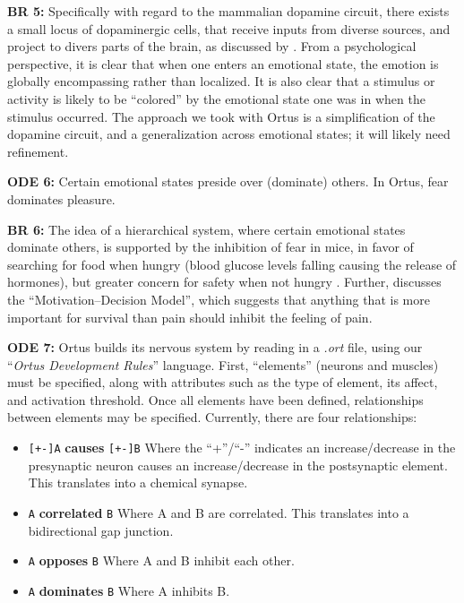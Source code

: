 \documentclass[letterpaper]{article}
\begin{document}
\textbf{BR 5:} Specifically with regard to the mammalian dopamine circuit, there exists a small locus of dopaminergic cells, that receive inputs from diverse sources, and project to divers parts of the brain, as discussed by \citet{Beier2015}. From a psychological perspective, it is clear that when one enters an emotional state, the emotion is globally encompassing rather than localized. It is also clear that a stimulus or activity is likely to be ``colored'' by the emotional state one was in when the stimulus occurred. The approach we took with Ortus is a simplification of the dopamine circuit, and a generalization across emotional states; it will likely need refinement.

\textbf{ODE 6:} Certain emotional states preside over (dominate) others. In Ortus, fear dominates pleasure.

\textbf{BR 6:} The idea of a hierarchical system, where certain emotional states dominate others, is supported by the inhibition of fear in mice, in favor of searching for food when hungry (blood glucose levels falling causing the release of hormones), but greater concern for safety when not hungry \citep{Verma2015}. Further, \citet{Leknes2008} discusses the ``Motivation--Decision Model'', which suggests that anything that is more important for survival than pain should inhibit the feeling of pain.


\textbf{ODE 7:} Ortus builds its nervous system by reading in a \textit{.ort} file, using our ``\textit{Ortus Development Rules}'' language. First, ``elements'' (neurons and muscles) must be specified, along with attributes such as the type of element, its affect, and activation threshold. Once all elements have been defined, relationships between elements may be specified. Currently, there are four relationships:
\begin{itemize}
    \itemsep0em
    \item \texttt{[+-]A} \textbf{causes} \texttt{[+-]B}
        \subitem Where the ``+''/``-'' indicates an increase/decrease in the presynaptic neuron causes an increase/decrease in the postsynaptic element. This translates into a chemical synapse.
    \item \texttt{A} \textbf{correlated} \texttt{B}
        \subitem Where A and B are correlated. This translates into a bidirectional gap junction.
    \item \texttt{A} \textbf{opposes} \texttt{B}
        \subitem Where A and B inhibit each other.
     \item \texttt{A} \textbf{dominates} \texttt{B}
         \subitem Where A inhibits B.
\end{itemize}
\end{document}
